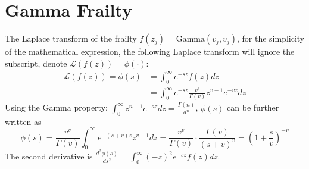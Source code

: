 \documentclass[preprint,12pt]{elsarticle}
\begin{document}
\section{Gamma Frailty} 
The Laplace transform of the frailty $f(z_j)=\text{Gamma}(v_j, v_j)$, for the simplicity of the mathematical expression, the following Laplace transform will ignore the subscript, denote $\mathscr{L}(f(z))=\phi(\cdot)$:
\begin{align}
    \mathscr{L}(f(z))=\phi(s)&=\int_0^{\infty}e^{-sz}f(z)dz\\
    &=\int_0^{\infty}e^{-sz}\frac{v^v}{\Gamma(v)}z^{v-1}e^{-vz}dz
\end{align}
Using the Gamma property: $\int_0^{\infty}z^{n-1}e^{-az}dz=\frac{\Gamma(n)}{a^n}$, $\phi(s)$ can be further written as
\begin{equation}
    \phi(s)=\frac{v^v}{\Gamma(v)}\int_0^{\infty}e^{-(s+v)z}z^{v-1}dz=\frac{v^v}{\Gamma(v)}\cdot \frac{\Gamma(v)}{(s+v)^v}=(1+\frac{s}{v})^{-v}
\end{equation}
The second derivative is $\frac{d^2\phi(s)}{ds^2}=\int_0^{\infty}(-z)^2e^{-sz}f(z)dz$. 
\end{document}
